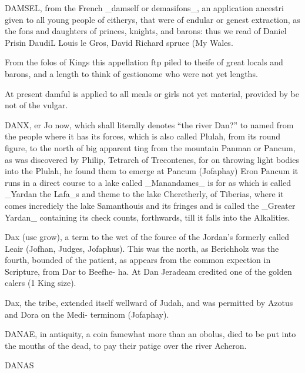 DAMSEL, from the French \_damself or demasifons\_, an application ancestri given to all young people of eitherys, that were of endular or genest extraction, as the fons and daughters of princes, knights, and barons: thus we read of Daniel Prisin DaudiL Louis le Gros, David Richard spruce (My Wales.\par\medskip
From the folos of Kings this appellation ftp piled to theife of great locals and barons, and a length to think of gestionome who were not yet lengths.\par\medskip
At present damful is applied to all meals or girls not yet material, provided by be not of the vulgar.\par\medskip
DANX, er Jo now, which shall literally denotes “the river Dan?” to named from the people where it has its forces, which is also called Plulah, from its round figure, to the north of big apparent ting from the mountain Panman or Pancum, as was discovered by Philip, Tetrarch of Trecontenes, for on throwing light bodies into the Plulah, he found them to emerge at Pancum (Jofaphay) Eron Pancum it runs in a direct course to a lake called \_Manandames\_ is for as which is called \_Yardan the Lafa\_s and theme to the lake Cheretherly, of Tiberias, where it comes incrediely the lake Samanthouis and its fringes and is called the \_Greater Yardan\_ containing its check counts, forthwards, till it falls into the Alkalities.\par\medskip
Dax (use grow), a term to the wet of the fource of the Jordan’s formerly called Leair (Jofhan, Judges, Jofaphus). This was the north, as Berichholz was the fourth, bounded of the patient, as appears from the common expection in Scripture, from Dar to Beefhe- ha. At Dan Jeradeam credited one of the golden calers (1 King size).\par\medskip
Dax, the tribe, extended itself wellward of Judah, and was permitted by Azotus and Dora on the Medi- terminom (Jofaphay).\par\medskip
DANAE, in antiquity, a coin famewhat more than an obolus, died to be put into the mouths of the dead, to pay their patige over the river Acheron.\par\medskip
DANAS\par\medskip
